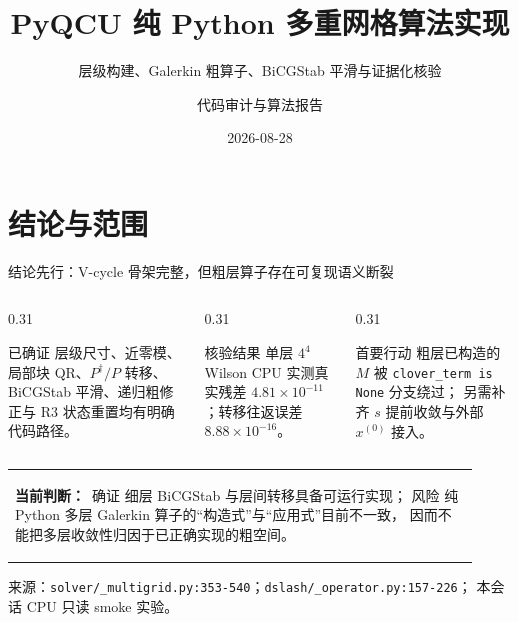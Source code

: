 \documentclass[UTF8,aspectratio=169,11pt]{ctexbeamer}
\title[纯 Python Multigrid]{PyQCU 纯 Python 多重网格算法实现}
\subtitle{层级构建、Galerkin 粗算子、BiCGStab 平滑与证据化核验}
\author[代码审计与算法报告]{代码审计与算法报告}
\institute{PyQCU}
\date{2026-08-28}
\newcommand{\source}[1]{%
  \vspace{0.06em}\par{\raggedright\scriptsize\color{muted}来源：#1\par}}
\newcommand{\pathref}[1]{\nolinkurl{#1}}
\newcommand{\verified}{\textcolor{evidence}{确证}}
\newcommand{\risk}{\textcolor{warn}{风险}}
\newcommand{\goodbox}[1]{\colorbox{evidence!10}{\parbox{0.90\linewidth}{#1}}}
\begin{document}
\begin{frame}[plain]
  \titlepage
\end{frame}

\section{结论与范围}

\begin{frame}[t]{结论先行：V-cycle 骨架完整，但粗层算子存在可复现语义断裂}
  \begin{columns}[T,totalwidth=\textwidth]
    \begin{column}{0.31\textwidth}
      \begin{block}{已确证}
        \small
        层级尺寸、近零模、局部块 QR、$P^\dagger/P$ 转移、BiCGStab 平滑、递归粗修正与 R3 状态重置均有明确代码路径。
      \end{block}
    \end{column}
    \begin{column}{0.31\textwidth}
      \begin{block}{核验结果}
        \small
        单层 $4^4$ Wilson CPU 实测真实残差
        $4.81\times10^{-11}$；转移往返误差
        $8.88\times10^{-16}$。
      \end{block}
    \end{column}
    \begin{column}{0.31\textwidth}
      \begin{block}{首要行动}
        \small
        粗层已构造的 $M$ 被
        \texttt{clover\_term is None} 分支绕过；
        另需补齐 $s$ 提前收敛与外部 $x^{(0)}$ 接入。
      \end{block}
    \end{column}
  \end{columns}
  \vspace{0.2em}
  \begin{tabular}{@{}p{0.92\linewidth}@{}}
    \goodbox{\textbf{当前判断：}\ \verified{} 细层 BiCGStab 与层间转移具备可运行实现；
    \risk{} 纯 Python 多层 Galerkin 算子的“构造式”与“应用式”目前不一致，
    因而不能把多层收敛性归因于已正确实现的粗空间。}
  \end{tabular}
  \source{\pathref{solver/_multigrid.py:353-540}；\pathref{dslash/_operator.py:157-226}；
  本会话 CPU 只读 smoke 实验。}
\end{frame}
\end{document}
